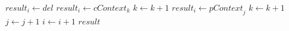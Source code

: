 \documentclass[11pt]{article}
\begin{document}
\begin{algorithm}
\begin{algorithmic}[1]
                  \State $\textit{result}_i \gets \textit{del}$
                \EndCase
                  \State $\textit{result}_i \gets \textit{cContext}_k$
                  \State $\textit{k} \gets \textit{k} + 1$
                \EndCase
                  \State $\textit{result}_i \gets \textit{pContext}_j$
                  \State $\textit{k} \gets \textit{k} + 1$
                \EndCase
              \EndSwitch
              \State $\textit{j} \gets \textit{j} + 1$
            \EndCase
          \EndSwitch
        \EndIf  
        \State $\textit{i} \gets \textit{i} + 1$
      \EndFor
      \Return $\textit{result}$
    \EndFunction
  \end{algorithmic}
\end{algorithm}
\end{document}
